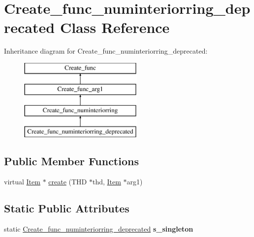 \hypertarget{classCreate__func__numinteriorring__deprecated}{}\section{Create\+\_\+func\+\_\+numinteriorring\+\_\+deprecated Class Reference}
\label{classCreate__func__numinteriorring__deprecated}
Inheritance diagram for Create\+\_\+func\+\_\+numinteriorring\+\_\+deprecated\+:\begin{figure}[H]
\begin{center}
\leavevmode
\includegraphics[height=4.000000cm]{classCreate__func__numinteriorring__deprecated}
\end{center}
\end{figure}
\subsection*{Public Member Functions}
\begin{DoxyCompactItemize}
\item 
virtual \mbox{\hyperlink{classItem}{Item}} $\ast$ \mbox{\hyperlink{classCreate__func__numinteriorring__deprecated_a7c9be02046e6dc03903ee77b2f103b88}{create}} (T\+HD $\ast$thd, \mbox{\hyperlink{classItem}{Item}} $\ast$arg1)
\end{DoxyCompactItemize}
\subsection*{Static Public Attributes}
\begin{DoxyCompactItemize}
\item 
\mbox{\label{classCreate__func__numinteriorring__deprecated_aa99acb3e8175517d0a40b4e202b264ad}} 
static \mbox{\hyperlink{classCreate__func__numinteriorring__deprecated}{Create\+\_\+func\+\_\+numinteriorring\+\_\+deprecated}} {\bfseries s\+\_\+singleton}
\end{DoxyCompactItemize}
